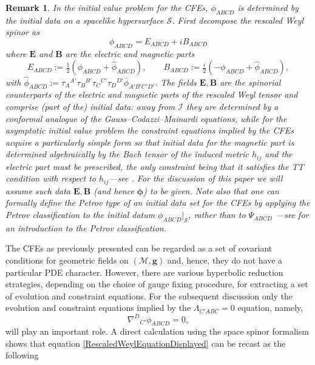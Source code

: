 \documentclass[10pt,a4paper]{article}
\theoremstyle{plain}
\newtheorem{remark}{Remark}
\def\bmg{{\bm g}}
\def\bmB{{\bm B}}
\def\bmE{{\bm E}}
\begin{document}
 \begin{remark}
 \label{G-C-M-Remark}
   \emph{In the initial value problem for the CFEs, $\phi_{ABCD}$ is
   determined by the initial data on a spacelike hypersurface
   $\mathcal{S}$. First decompose the rescaled Weyl spinor as
   \[ \phi_{ABCD}=E_{ABCD}+iB_{ABCD}\]
where $\bmE$ and $\bmB$ are the \textit{electric} and
\textit{magnetic} parts
   \[
   E_{ABCD} := \tfrac{1}{2}(\phi_{ABCD} + \hat{\phi}_{ABCD}),\qquad
   B_{ABCD} := \tfrac{i}{2}(-\phi_{ABCD} + \hat{\phi}_{ABCD}),
  \]
  with
  $\hat{\phi}_{ABCD}:=\tau_A{}^{A'}\tau_B{}^{B'}\tau_C{}^{C'}\tau_D{}^{D'}\bar{\phi}_{A'B'C'D'}$. The
  fields $\bmE,\bmB$ are the spinorial counterparts of the electric
  and magnetic parts of the rescaled Weyl tensor and comprise (part of
  the) initial data: away from $\mathscr{I}$ they are determined by
  a conformal analogue of the Gauss--Codazzi--Mainardi equations, while for the asymptotic
  initial value problem the constraint equations implied by the CFEs
  acquire a particularly simple form so that initial data for the
  magnetic part is determined algebraically by the Bach tensor of the
  induced metric $h_{ij}$ and the electric part must be prescribed,
  the only constraint being that it satisfies the
  \textit{TT} condition with respect to $h_{ij}$---see \cite{CFEbook,
    GasVal17a}.  For the discussion of this paper we will assume such
  data $\bmE, \bmB$ (and hence $\bm\phi$) to be given. Note also that one can
  formally define the Petrov type of an initial data set for the CFEs
  by applying the Petrov classification to the initial datum
  $\phi_{ABCD}|_{\mathcal{S}}$, rather than to $\Psi_{ABCD}$ ---see
  \cite{Ste91} for an introduction to the Petrov classification.  }
\end{remark}
The CFEs as previously presented can be regarded as a set of covariant
conditions for geometric fields on $(\mathcal{M},\bmg)$ and, hence,
they do not have a particular PDE character. However, there are
various hyperbolic reduction strategies, depending on the choice of
gauge fixing procedure, for extracting a set of evolution and
constraint equations.  For the subsequent discussion only the
evolution and constraint equations implied by the $\Lambda_{C'ABC}=0$
equation, namely,
\begin{equation}\label{RescaledWeylEquationDisplayed}
 \nabla^D{}_{C'}\phi _{ABCD}=0,
\end{equation}
will play an important role.  A direct calculation using the space
spinor formalism shows that equation
\eqref{RescaledWeylEquationDisplayed} can be recast as the following
\end{document}

